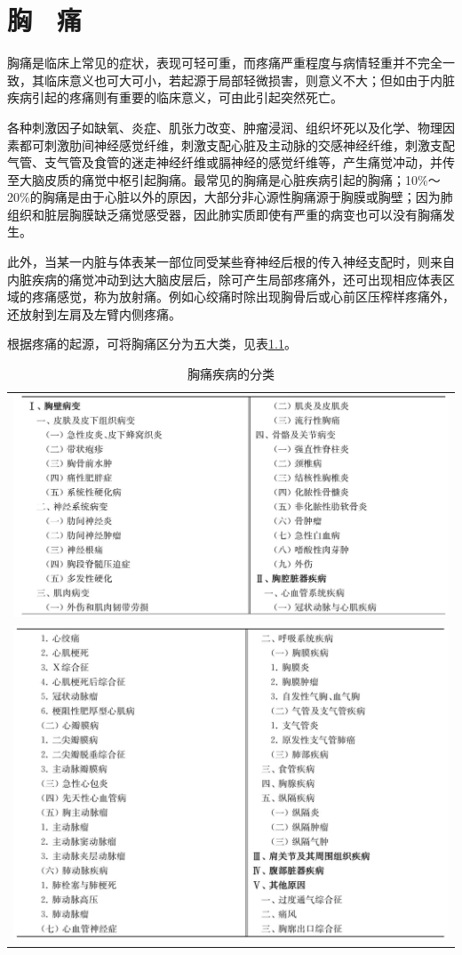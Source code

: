 \chapter{胸　痛}

胸痛是临床上常见的症状，表现可轻可重，而疼痛严重程度与病情轻重并不完全一致，其临床意义也可大可小，若起源于局部轻微损害，则意义不大；但如由于内脏疾病引起的疼痛则有重要的临床意义，可由此引起突然死亡。

各种刺激因子如缺氧、炎症、肌张力改变、肿瘤浸润、组织坏死以及化学、物理因素都可刺激肋间神经感觉纤维，刺激支配心脏及主动脉的交感神经纤维，刺激支配气管、支气管及食管的迷走神经纤维或膈神经的感觉纤维等，产生痛觉冲动，并传至大脑皮质的痛觉中枢引起胸痛。最常见的胸痛是心脏疾病引起的胸痛；10\%～20\%的胸痛是由于心脏以外的原因，大部分非心源性胸痛源于胸膜或胸壁；因为肺组织和脏层胸膜缺乏痛觉感受器，因此肺实质即使有严重的病变也可以没有胸痛发生。

此外，当某一内脏与体表某一部位同受某些脊神经后根的传入神经支配时，则来自内脏疾病的痛觉冲动到达大脑皮层后，除可产生局部疼痛外，还可出现相应体表区域的疼痛感觉，称为放射痛。例如心绞痛时除出现胸骨后或心前区压榨样疼痛外，还放射到左肩及左臂内侧疼痛。

根据疼痛的起源，可将胸痛区分为五大类，见表\ref{tab10-1}。

\begin{longtable}{c}
 \caption{胸痛疾病的分类}
 \label{tab10-1}
 \endfirsthead
 \caption[]{胸痛疾病的分类}
 \endhead
 \includegraphics[width=\textwidth,height=\textheight,keepaspectratio]{./images/Image00068.jpg}\\
 \includegraphics[width=\textwidth,height=\textheight,keepaspectratio]{./images/Image00069.jpg}
 \end{longtable}

